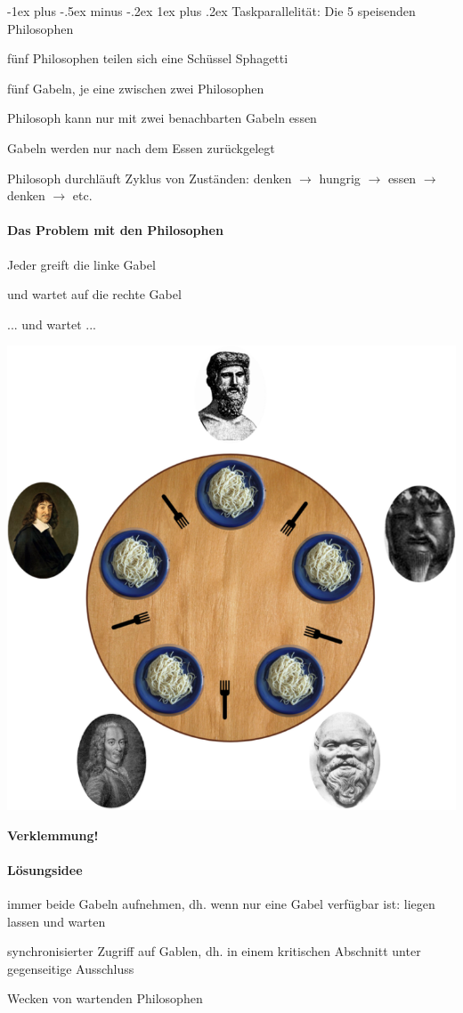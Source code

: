 \documentclass[10pt]{article}
\makeatletter
\renewcommand{\subsubsection}{\@startsection{subsubsection}{3}{0mm}%
                                {-1ex plus -.5ex minus -.2ex}%
                                {1ex plus .2ex}%
                                {\normalfont\small\bfseries}}
\makeatother
\begin{document}
  \subsubsection{Taskparallelität: Die 5 speisenden Philosophen}
  \begin{itemize*}
    \item fünf Philosophen teilen sich eine Schüssel Sphagetti
    \item fünf Gabeln, je eine zwischen zwei Philosophen
    \item Philosoph kann nur mit zwei benachbarten Gabeln essen
    \item Gabeln werden nur nach dem Essen zurückgelegt
    \item Philosoph durchläuft Zyklus von Zuständen: denken $\rightarrow$ hungrig $\rightarrow$ essen $\rightarrow$ denken $\rightarrow$ etc.
  \end{itemize*}
  
  \paragraph{Das Problem mit den Philosophen}
  
  \begin{itemize*}
    \item Jeder greift die linke Gabel
    \item und wartet auf die rechte Gabel
    \item ... und wartet ...
  \end{itemize*}
  \begin{center}
    \includegraphics[width=0.3\linewidth]{Assets/Programmierparadigmen-philosophen}
  \end{center}
  \color{orange} \textbf{Verklemmung!} \color{black}
  
  \paragraph{Lösungsidee}
  
  \begin{itemize*}
    \item immer beide Gabeln aufnehmen, dh. wenn nur eine Gabel verfügbar ist: liegen lassen und warten
    \item synchronisierter Zugriff auf Gablen, dh. in einem kritischen Abschnitt unter gegenseitige Ausschluss
    \item Wecken von wartenden Philosophen
  \end{itemize*}
  
\end{document}
